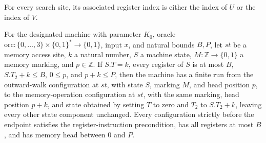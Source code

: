 \begin{lemma}
\label{Complexity.LogProg.ExpBFS.idx_cases}
\leanok
{}
For every search site, its associated register index is either the index of $U$ or the
index of $V$.
\end{lemma}

\begin{theorem}
\label{Complexity.LogProg.ExpBFS.wo_run}
\leanok
{}
For the designated machine with parameter $K_0$, oracle
$\mathrm{orc}:\{0,\ldots,3\}\times\{0,1\}^*\to\{0,1\}$, input $x$, and natural bounds
$B,P$, let $st$ be a memory access site, $k$ a natural number, $S$ a machine state,
$M:\mathbb Z\to\{0,1\}$ a memory marking, and $p\in\mathbb Z$. If $S.T=k$, every
register of $S$ is at most $B$, $S.T_2+k\le B$, $0\le p$, and $p+k\le P$, then the
machine has a finite run from the outward-walk configuration at $st$, with state $S$,
marking $M$, and head position $p$, to the memory-operation configuration at $st$, with
the same marking, head position $p+k$, and state obtained by setting $T$ to zero and
$T_2$ to $S.T_2+k$, leaving every other state component unchanged. Every configuration
strictly before the endpoint satisfies the register-instruction precondition, has all
registers at most $B$, and has memory head between $0$ and $P$.
\end{theorem}

